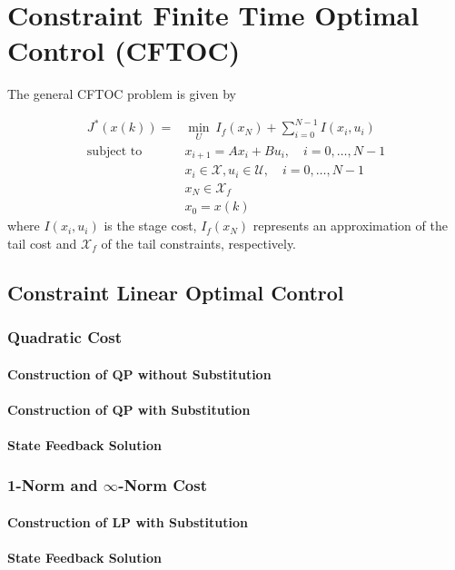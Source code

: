 \section{Constraint Finite Time Optimal Control (CFTOC)}

The general CFTOC problem is given by

\begin{align*}
    J^*(x(k)) =            & \min_U \: I_f(x_N) + \sum_{i=0}^{N-1}I(x_i,u_i)                    \\
    \text{subject to}\quad & x_{i+1} = Ax_i +Bu_i, \quad i = 0, \ldots, N-1                     \\
                           & x_i \in \mathcal{X}, u_i \in \mathcal{U}, \quad i = 0, \ldots, N-1 \\
                           & x_N \in \mathcal{X}_f                                              \\
                           & x_0 = x(k)
\end{align*}
where $I(x_i,u_i)$ is the stage cost, $I_f(x_N)$ represents an approximation of the tail cost and $\mathcal{X}_f$ of the tail constraints, respectively.

\subsection{Constraint Linear Optimal Control}

\subsubsection{Quadratic Cost}

\paragraph{Construction of QP without Substitution}

\paragraph{Construction of QP with Substitution}

\paragraph{State Feedback Solution}

\subsubsection[1-Norm and Inf-Norm Cost]{1-Norm and $\infty$-Norm Cost}

\paragraph{Construction of LP with Substitution}

\paragraph{State Feedback Solution}